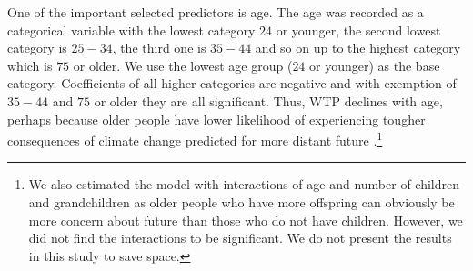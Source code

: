 \documentclass[a4paper,12pt]{article}
\begin{document}
One of the important selected predictors is age. The age was recorded as a categorical variable with the lowest category $24$ or younger, the second lowest category is $25-34$, the third one is $35-44$ and so on up to the highest category which is  $75$ or older. We use the lowest age group ($24$ or younger) as the base category. Coefficients of all higher categories are negative and with exemption of $35-44$ and $75$ or older they are all significant. Thus, WTP declines with age, perhaps because older people have lower likelihood of experiencing tougher consequences of climate change predicted for more distant future \citep{Hamilton2011}.\footnote{We also estimated the model with interactions of age and number of children and grandchildren as older people who have more offspring can obviously be more concern about future than those who do not have children. However, we did not find the interactions to be significant. We do not present the results in this study to save space.}
\end{document}
